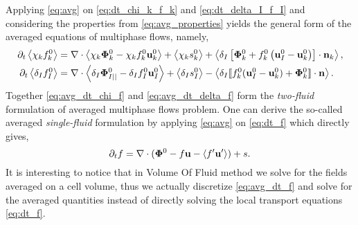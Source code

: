Applying \ref{eq:avg} on \ref{eq:dt_chi_k_f_k} and \ref{eq:dt_delta_I_f_I} and considering the properties from \ref{eq:avg_properties} yields the general form of the averaged equations of multiphase flows, namely,
\begin{align}
    \partial_t \left<\chi_k f_k^0\right>
    &= \mathbf{\nabla}\cdot \left<\chi_k \mathbf{\Phi}_k^0 - \chi_k f_k^0 \textbf{u}_k^0\right>
    + \left<\chi_k s_k^0\right>
    + \left<\delta_I\left[
        \mathbf{\Phi}_k^0
        + f_k^0
        \left(
            \textbf{u}_I^0
            - \textbf{u}_k^0
        \right)
    \right]
    \cdot \textbf{n}_k\right> ,
    \label{eq:avg_dt_chi_f}\\
    \partial_t \left<\delta_If_I^0\right>
    &= 
    \mathbf{\nabla}\cdot \left<\delta_I \mathbf{\Phi}_{I||}^0 - \delta_I f_I^0 \textbf{u}_I^0\right>
    +\left<\delta_Is_I^0\right> 
    - \left<\delta_I \llbracket 
    f_k^0 (\textbf{u}_I^0 - \textbf{u}_k^0)
    + \mathbf{\Phi}_k^0
     \rrbracket \cdot \textbf{n} \right>.
    \label{eq:avg_dt_delta_f}
\end{align}
Together \ref{eq:avg_dt_chi_f}  and \ref{eq:avg_dt_delta_f} form the \textit{two-fluid} formulation of averaged multiphase flows problem. 
One can derive the so-called averaged \textit{single-fluid} formulation by applying \ref{eq:avg} on \ref{eq:dt_f} which directly gives, 
\begin{equation}
    \partial_t f
    = \mathbf{\nabla}\cdot (\mathbf{\Phi}^0 - f \textbf{u} - \left<f'\textbf{u}'\right>)
    + s.
    \label{eq:avg_dt_f}
\end{equation}
It is interesting to notice that in Volume Of Fluid method we solve for the fields averaged on a cell volume, thus we actually discretize \ref{eq:avg_dt_f} and solve for the averaged quantities \citep{popinet2018numerical,tryggvason2011direct} instead of directly solving the local transport equations \ref{eq:dt_f}.


